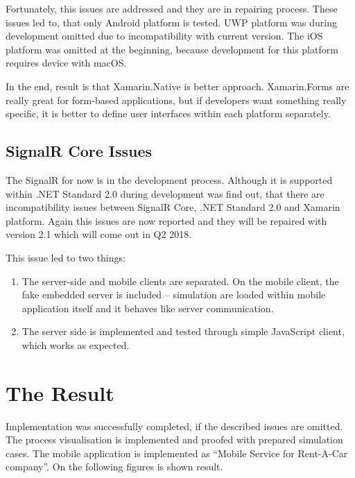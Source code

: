 Fortunately, this issues are addressed and they are in repairing process. These issues led to, that only Android platform is tested. UWP platform was during development omitted due to incompatibility with current version. The iOS platform was omitted at the beginning, because development for this platform requires device with macOS. 

In the end, result is that Xamarin.Native is better approach. Xamarin.Forms are really great for form-based applications, but if developers want something really specific, it is better to define user interfaces within each platform separately. 

\subsection{SignalR Core Issues}
The SignalR for now is in the development process. Although it is supported within .NET Standard 2.0 during development was find out, that there are incompatibility issues between SignalR Core, .NET Standard 2.0 and Xamarin platform. Again this issues are now reported and they will be repaired with version 2.1 which will come out in Q2 2018.

This issue led to two things:
\begin{enumerate}
\item The server-side and mobile clients are separated. On the mobile client, the fake embedded server is included -- simulation are loaded within mobile application itself and it behaves like server communication. 
\item The server side is implemented and tested through simple JavaScript client, which works as expected. 
\end{enumerate}

\section{The Result}
Implementation was successfully completed, if the described issues are omitted. The process visualisation is implemented and proofed with prepared simulation cases. The mobile application is implemented as ``Mobile Service for Rent-A-Car  company''. On the following figures is shown result. 


